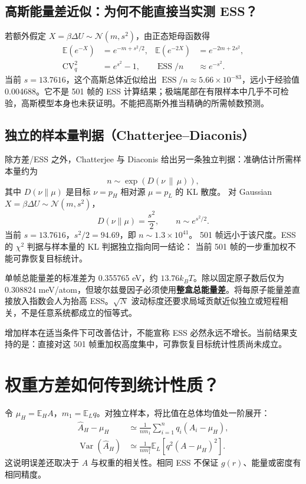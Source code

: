\documentclass[11pt,a4paper]{article}
\newcommand{\E}{\mathbb E}\newcommand{\Var}{\operatorname{Var}}
\newcommand{\ESS}{\operatorname{ESS}}
\begin{document}
\subsection{高斯能量差近似：为何不能直接当实测 ESS？}
若额外假定 $X=\beta\Delta U\sim\mathcal N(m,s^2)$，由正态矩母函数得
\begin{align}
\E(e^{-X})&=e^{-m+s^2/2},&\E(e^{-2X})&=e^{-2m+2s^2},\\
\mathrm{CV}_q^2&=e^{s^2}-1,&\ESS/n&\approx e^{-s^2}.
\end{align}
当前 $s=13.7616$，这个高斯总体近似给出 $\ESS/n\approx5.66\times10^{-83}$，远小于经验值 0.004688。它不是 501 帧的 ESS 计算结果；极端尾部在有限样本中几乎不可检验，高斯模型本身也未获证明。不能把高斯外推当精确的所需帧数预测。

\subsection{独立的样本量判据（Chatterjee--Diaconis）}
除方差/ESS 之外，Chatterjee 与 Diaconis 给出另一条独立判据：准确估计所需样本量约为
\begin{equation}
 n\sim\exp\!\left(D(\nu\,\|\,\mu)\right),
\end{equation}
其中 $D(\nu\|\mu)$ 是目标 $\nu=p_H$ 相对源 $\mu=p_L$ 的 KL 散度。
对 Gaussian $X=\beta\Delta U\sim\mathcal N(m,s^2)$，
\begin{equation}
 D(\nu\|\mu)=\frac{s^2}{2},\qquad n\sim e^{s^2/2}.
\end{equation}
当前 $s=13.7616$，$s^2/2=94.69$，即 $n\sim1.3\times10^{41}$。
501 帧远小于该尺度。ESS 的 $\chi^2$ 判据与样本量的 KL 判据独立指向同一结论：
当前 501 帧的一步重加权不能可靠恢复目标统计。

单帧总能量差的标准差为 0.355765 eV，约 $13.76k_BT$。除以固定原子数后仅为 0.308824 meV/atom，但玻尔兹曼因子必须使用\textbf{整盒总能量差}。将每原子能量差直接放入指数会人为抬高 ESS。$\sqrt{N}$ 波动标度还要求局域贡献近似独立或短程相关，不是任意系统都成立的恒等式。

增加样本在适当条件下可改善估计，不能宣称 ESS 必然永远不增长。当前结果支持的是：直接对这 501 帧重加权高度集中，可靠恢复目标统计性质尚未成立。
\newpage
\section{权重方差如何传到统计性质？}
令 $\mu_H=\E_H A$，$m_1=\E_L q$。对独立样本，将比值在总体均值处一阶展开：
\begin{align}
\hat A_H-\mu_H
&\simeq\frac1{nm_1}\sum_{i=1}^nq_i(A_i-\mu_H),\\
\Var(\hat A_H)&\simeq\frac1{nm_1^2}\E_L[q^2(A-\mu_H)^2].
\end{align}
这说明误差还取决于 $A$ 与权重的相关性。相同 ESS 不保证 $g(r)$、能量或密度有相同精度。
\end{document}
